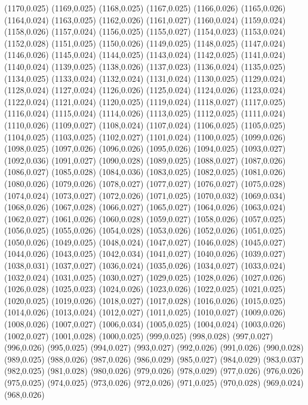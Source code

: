 (1170,0.025)
(1169,0.025)
(1168,0.025)
(1167,0.025)
(1166,0.026)
(1165,0.026)
(1164,0.024)
(1163,0.025)
(1162,0.026)
(1161,0.027)
(1160,0.024)
(1159,0.024)
(1158,0.026)
(1157,0.024)
(1156,0.025)
(1155,0.027)
(1154,0.023)
(1153,0.024)
(1152,0.028)
(1151,0.025)
(1150,0.026)
(1149,0.025)
(1148,0.025)
(1147,0.024)
(1146,0.026)
(1145,0.024)
(1144,0.025)
(1143,0.024)
(1142,0.025)
(1141,0.024)
(1140,0.024)
(1139,0.025)
(1138,0.026)
(1137,0.023)
(1136,0.024)
(1135,0.025)
(1134,0.025)
(1133,0.024)
(1132,0.024)
(1131,0.024)
(1130,0.025)
(1129,0.024)
(1128,0.024)
(1127,0.024)
(1126,0.026)
(1125,0.024)
(1124,0.026)
(1123,0.024)
(1122,0.024)
(1121,0.024)
(1120,0.025)
(1119,0.024)
(1118,0.027)
(1117,0.025)
(1116,0.024)
(1115,0.024)
(1114,0.026)
(1113,0.025)
(1112,0.025)
(1111,0.024)
(1110,0.026)
(1109,0.027)
(1108,0.024)
(1107,0.024)
(1106,0.025)
(1105,0.025)
(1104,0.025)
(1103,0.025)
(1102,0.027)
(1101,0.024)
(1100,0.025)
(1099,0.026)
(1098,0.025)
(1097,0.026)
(1096,0.026)
(1095,0.026)
(1094,0.025)
(1093,0.027)
(1092,0.036)
(1091,0.027)
(1090,0.028)
(1089,0.025)
(1088,0.027)
(1087,0.026)
(1086,0.027)
(1085,0.028)
(1084,0.036)
(1083,0.025)
(1082,0.025)
(1081,0.026)
(1080,0.026)
(1079,0.026)
(1078,0.027)
(1077,0.027)
(1076,0.027)
(1075,0.028)
(1074,0.024)
(1073,0.027)
(1072,0.026)
(1071,0.025)
(1070,0.032)
(1069,0.034)
(1068,0.026)
(1067,0.028)
(1066,0.027)
(1065,0.027)
(1064,0.026)
(1063,0.024)
(1062,0.027)
(1061,0.026)
(1060,0.028)
(1059,0.027)
(1058,0.026)
(1057,0.025)
(1056,0.025)
(1055,0.026)
(1054,0.028)
(1053,0.026)
(1052,0.026)
(1051,0.025)
(1050,0.026)
(1049,0.025)
(1048,0.024)
(1047,0.027)
(1046,0.028)
(1045,0.027)
(1044,0.026)
(1043,0.025)
(1042,0.034)
(1041,0.027)
(1040,0.026)
(1039,0.027)
(1038,0.031)
(1037,0.027)
(1036,0.024)
(1035,0.026)
(1034,0.027)
(1033,0.024)
(1032,0.024)
(1031,0.025)
(1030,0.027)
(1029,0.025)
(1028,0.026)
(1027,0.026)
(1026,0.028)
(1025,0.023)
(1024,0.026)
(1023,0.026)
(1022,0.025)
(1021,0.025)
(1020,0.025)
(1019,0.026)
(1018,0.027)
(1017,0.028)
(1016,0.026)
(1015,0.025)
(1014,0.026)
(1013,0.024)
(1012,0.027)
(1011,0.025)
(1010,0.027)
(1009,0.026)
(1008,0.026)
(1007,0.027)
(1006,0.034)
(1005,0.025)
(1004,0.024)
(1003,0.026)
(1002,0.027)
(1001,0.028)
(1000,0.025)
(999,0.025)
(998,0.028)
(997,0.027)
(996,0.026)
(995,0.025)
(994,0.027)
(993,0.027)
(992,0.026)
(991,0.026)
(990,0.028)
(989,0.025)
(988,0.026)
(987,0.026)
(986,0.029)
(985,0.027)
(984,0.029)
(983,0.037)
(982,0.025)
(981,0.028)
(980,0.026)
(979,0.026)
(978,0.029)
(977,0.026)
(976,0.026)
(975,0.025)
(974,0.025)
(973,0.026)
(972,0.026)
(971,0.025)
(970,0.028)
(969,0.024)
(968,0.026)
